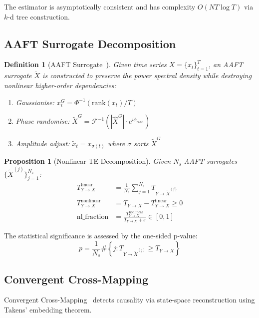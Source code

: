 \documentclass[12pt,a4paper]{article}
\newtheorem{proposition}[theorem]{Proposition}
\newtheorem{definition}[theorem]{Definition}
\begin{document}
The estimator is asymptotically consistent and has complexity $O(NT\log T)$ via
$k$-d tree construction.

\subsection{AAFT Surrogate Decomposition}

\begin{definition}[AAFT Surrogate~\citep{theiler1992}]
Given time series $X = \{x_t\}_{t=1}^T$, an AAFT surrogate $\tilde{X}$ is
constructed to preserve the power spectral density while destroying nonlinear
higher-order dependencies:
\begin{enumerate}
    \item Gaussianise: $x_t^G = \Phi^{-1}(\text{rank}(x_t) / T)$
    \item Phase randomise: $\tilde{X}^G = \mathcal{F}^{-1}\!\left(|\hat{X}^G|\cdot e^{i\phi_\text{rand}}\right)$
    \item Amplitude adjust: $\tilde{x}_t = x_{\sigma(t)}$ where $\sigma$ sorts $\tilde{X}^G$
\end{enumerate}
\end{definition}

\begin{proposition}[Nonlinear TE Decomposition]
Given $N_s$ AAFT surrogates $\{\tilde{X}^{(j)}\}_{j=1}^{N_s}$:
\begin{align}
    T_{Y \to X}^{\text{linear}} &= \frac{1}{N_s} \sum_{j=1}^{N_s} T_{Y \to \tilde{X}^{(j)}} \\
    T_{Y \to X}^{\text{nonlinear}} &= T_{Y \to X} - T_{Y \to X}^{\text{linear}} \geq 0 \\
    \text{nl\_fraction} &= \frac{T_{Y \to X}^{\text{nonlinear}}}{T_{Y \to X} + \varepsilon} \in [0,1]
\end{align}
\end{proposition}

The statistical significance is assessed by the one-sided p-value:
\begin{equation}
    p = \frac{1}{N_s}\#\!\left\{j : T_{Y \to \tilde{X}^{(j)}} \geq T_{Y \to X}\right\}
\end{equation}

\subsection{Convergent Cross-Mapping}

Convergent Cross-Mapping~\citep{sugihara2012} detects causality via state-space
reconstruction using Takens' embedding theorem.
\end{document}
